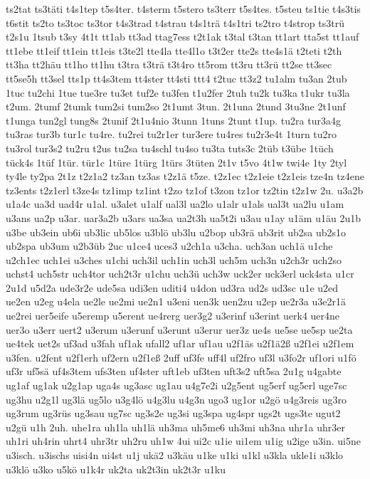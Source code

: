 {ts2tat
ts3täti
t4s1tep
t5s4ter.
t4sterm
t5stero
ts3terr
t5s4tes.
t5steu
ts1tie
t4s3tis
t6stit
ts2to
ts3toc
ts3tor
t4s3trad
t4strau
t4s1trä
t4s1tri
ts2tro
t4strop
ts3trü
t2s1u
1tsub
t3sy
4t1t
tt1ab
tt3ad
ttag7ess
t2t1ak
t3tal
t3tan
tt1art
tta5st
tt1auf
tt1ebe
tt1eif
tt1ein
tt1eis
t3te2l
tte4la
tte4l1o
t3t2er
tte2s
tte4s1ä
t2teti
t2th
tt3ha
tt2häu
tt1ho
tt1hu
t3tra
t3trä
t3t4ro
tt5rom
tt3ru
tt3rü
tt2se
tt3sec
tt5se5h
tt3sel
tts1p
tt4s3tem
tt4ster
tt4sti
ttt4
t2tuc
tt3z2
tu1alm
tu3an
2tub
1tuc
tu2chi
1tue
tue3re
tu3et
tuf2e
tu3fen
t1u2fer
2tuh
tu2k
tu3ka
t1ukr
tu3la
t2um.
2tumf
2tumk
tum2si
tum2so
2t1umt
3tun.
2t1una
2tund
3tu3ne
2t1unf
t1unga
tun2gl
tung8s
2tunif
2t1u4nio
3tunn
1tuns
2tunt
t1up.
tu2ra
tur3a4g
tu3ras
tur3b
tur1c
tu4re.
tu2rei
tu2r1er
tur3ere
tu4res
tu2r3e4t
1turn
tu2ro
tu3rol
tur3s2
tu2ru
t2us
tu2sa
tu4schl
tu4so
tu3ta
tuts3c
2tüb
t3übe
1tüch
tück4s
1tüf
1tür.
tür1c
1türe
1türg
1türs
3tüten
2t1v
t5vo
4t1w
twi4e
1ty
2tyl
ty4le
ty2pa
2t1z
t2z1a2
tz3an
tz3as
t2z1ä
t5ze.
t2z1ec
t2z1eie
t2z1eis
tze4n
tz4ene
tz3ents
t2z1erl
t3ze4s
tz1imp
tz1int
t2zo
tz1of
t3zon
tz1or
tz2tin
t2z1w
2u.
u3a2b
u1a4c
ua3d
uad4r
u1al.
u3alet
u1alf
ual3l
ua2lo
u1alr
u1als
ual3t
ua2lu
u1am
u3ans
ua2p
u3ar.
uar3a2b
u3ars
ua3sa
ua2t3h
ua5t2i
u3au
u1ay
u1äm
u1äu
2u1b
u3be
ub3ein
ub6i
ub3lic
ub5los
u3blö
ub3lu
u2bop
ub3rä
ub3rit
ub2sa
ub2s1o
ub2spa
ub3um
u2b3üb
2uc
u1ce4
uces3
u2ch1a
u3cha.
uch3an
uch1ä
u1che
u2ch1ec
uch1ei
u3ches
u1chi
uch3il
uch1in
uch3l
uch5m
uch3n
u2ch3r
uch2so
uchst4
uch5str
uch4tor
uch2t3r
u1chu
uch3ü
uch3w
uck2er
uck3erl
uck4sta
u1cr
2u1d
u5d2a
ude3r2e
ude5sa
udi3en
uditi4
u4don
ud3ra
ud2s
ud3sc
u1e
u2ed
ue2en
u2eg
u4ela
ue2le
ue2mi
ue2n1
u3eni
uen3k
uen2zu
u2ep
ue2r3a
u3e2r1ä
ue2rei
uer5eife
u5eremp
u5erent
ue4rerg
uer3g2
u3erinf
u3erint
uerk4
uer4ne
uer3o
u3err
uert2
u3erum
u3erunf
u3erunt
u3erur
uer3z
ue4s
ue5se
ue5sp
ue2ta
ue4tek
uet2s
uf3ad
u3fah
uf1ak
ufall2
uf1ar
uf1au
u2f1äs
u2f1ä2ß
u2f1ei
u2f1em
u3fen.
u2fent
u2f1erh
uf2ern
u2f1eß
2uff
uf3fe
uff4l
uf2fro
uf3l
u3fo2r
uf1ori
u1fö
uf3r
uf5sä
uf4s3tem
ufs3ten
uf4ster
uft1eb
uf3ten
uft3s2
uft5sa
2u1g
u4gabte
ug1af
ug1ak
u2g1ap
uga4s
ug3asc
ug1au
u4g7e2i
u2g5ent
ug5erf
ug5erl
uge7sc
ug3hu
u2g1l
ug3lä
ug5lo
u3g4lö
u4g3lu
u4g3n
ugo3
ug1or
u2gö
u4g3reis
ug3ro
ug3rum
ug3rüs
ug3sau
ug7sc
ug3s2e
ug3si
ug3spa
ug4spr
ugs2t
ugs3te
ugut2
u2gü
u1h
2uh.
uhe1ra
uh1la
uh1lä
uh3ma
uh5me6
uh3mi
uh3na
uhr1a
uhr3er
uh1ri
uh4rin
uhrt4
uhr3tr
uh2ru
uh1w
4ui
ui2c
u1ie
ui1em
u1ig
u2ige
u3in.
ui5ne
u3isch.
u3ischs
uisi4n
ui4st
u1j
ukä2
u3käu
u1ke
u1ki
u1kl
u3kla
ukle1i
u3klo
u3klö
u3ko
u5kö
u1k4r
uk2ta
uk2t3in
uk2t3r
u1ku
}
